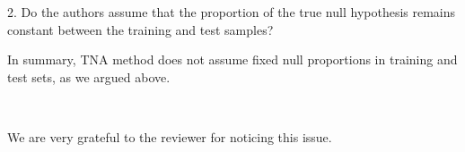 \documentclass{article}
\newcommand{\response}[1]{\vspace*{1ex} \color{blue} \noindent #1 \color{black}
\vspace*{2ex}}
\begin{document}
2. Do the authors assume that the proportion of the true null hypothesis remains constant between the training and test samples?

\response{In summary, TNA method does not assume fixed null proportions in training and test sets, as we argued above.}

 \

\response{We are very grateful to the reviewer for noticing this issue.}




\end{document}
